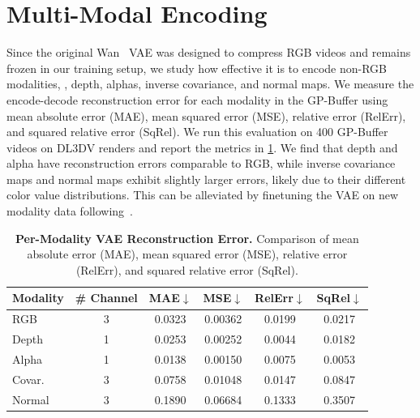 \section{Multi-Modal Encoding}
\label{supp:vae_encoding}
Since the original Wan~\cite{wan2025} VAE was designed to compress RGB videos and remains frozen in our training setup, we study how effective it is to encode non-RGB modalities, \ie, depth, alphas, inverse covariance, and normal maps. We measure the encode-decode reconstruction error for each modality in the GP-Buffer using mean absolute error (MAE), mean squared error (MSE), relative error (RelErr), and squared relative error (SqRel). We run this evaluation on 400 GP-Buffer videos on DL3DV renders and report the metrics in \cref{tab:vae}. We find that depth and alpha have reconstruction errors comparable to RGB, while inverse covariance maps and normal maps exhibit slightly larger errors, likely due to their different color value distributions. This can be alleviated by finetuning the VAE on new modality data following~\cite{jiang2025geo4d,szymanowicz2025bolt3d}.


\begin{table}[h]
\centering
\footnotesize
\setlength{\tabcolsep}{4pt}
\begin{tabular}{lccccc}
\toprule
\textbf{Modality} & \# Channel & \textbf{MAE}$\downarrow$ & \textbf{MSE}$\downarrow$ & \textbf{RelErr}$\downarrow$ & \textbf{SqRel}$\downarrow$ \\
\midrule
RGB  &  3 & 0.0323 & 0.00362 & 0.0199 & 0.0217 \\
Depth&  1 & 0.0253 & 0.00252 & 0.0044 & 0.0182 \\
Alpha&  1 & 0.0138 & 0.00150 & 0.0075 & 0.0053 \\
Covar.& 3 & 0.0758 & 0.01048 & 0.0147 & 0.0847 \\
Normal& 3 & 0.1890  & 0.06684 & 0.1333 & 0.3507 \\
\bottomrule
\end{tabular}
\caption{\textbf{Per-Modality VAE Reconstruction Error.} Comparison of mean absolute error (MAE), mean squared error (MSE), relative error (RelErr), and squared relative error (SqRel).}
\label{tab:vae}
\end{table}

